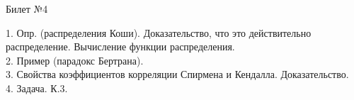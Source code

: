 \documentclass[preview]{standalone}
\begin{document}
 
\begin{center} {\Large Билет №4} \end{center} 

1.  Опр. (распределения Коши). Доказательство, что это действительно распределение. Вычисление функции распределения.\\

2.  Пример (парадокс Бертрана). \\

3.  Свойства коэффициентов корреляции Спирмена и Кендалла. Доказательство. \\

4. Задача. К.3.\\
\end{document}
